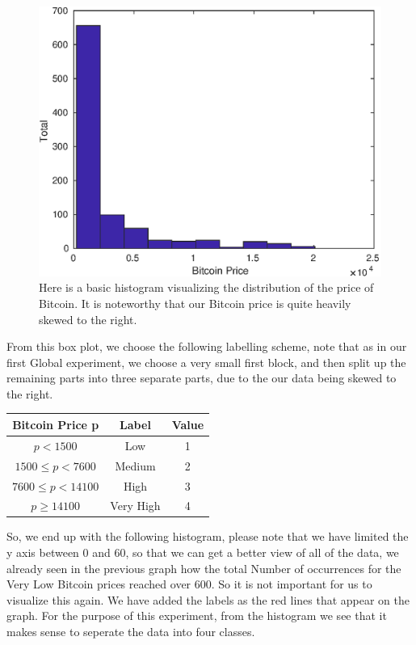 \documentclass{article}
\begin{document}
\begin{figure}[H]
\centering
\caption{Here is a basic histogram visualizing the distribution of the price of Bitcoin. It is noteworthy that our Bitcoin price is quite heavily skewed to the right.}
\includegraphics{final/btc_priceOnly.eps}
\end{figure}

From this box plot, we choose the following labelling scheme, note that as in our first Global experiment, we choose a very small first block, and then split up the remaining parts into three separate parts, due to the our data being skewed to the right.

\begin{center}
\begin{tabular}{ |c|c|c| } 
\hline
Bitcoin Price p & Label & Value\\
\hline
$p < 1500$ & Low & 1\\ 
$1500 \leq p < 7600$ & Medium & 2\\ 
$7600 \leq p < 14100$ & High & 3\\ 
$ p \geq 14100$ & Very High & 4\\ 
\hline
\end{tabular}
\end{center}

So, we end up with the following histogram, please note that we have limited the y axis between 0 and 60, so that we can get a better view of all of the data, we already seen in the previous graph how the total Number of occurrences for the Very Low Bitcoin prices reached over 600. So it is not important for us to visualize this again. We have added the labels as the red lines that appear on the graph. For the purpose of this experiment, from the histogram we see that it makes sense to seperate the data into four classes.
\end{document}
